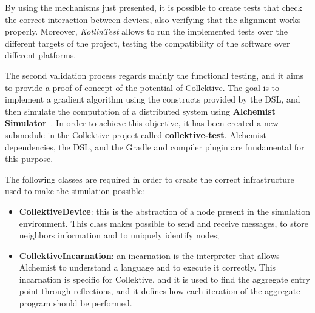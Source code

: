 By using the mechanisms just presented, it is possible to create tests that check the correct interaction between devices, also verifying that the alignment works properly. Moreover, \textit{KotlinTest} allows to run the implemented tests over the different targets of the project, testing the compatibility of the software over different platforms.

The second validation process regards mainly the functional testing, and it aims to provide a proof of concept of the potential of Collektive.\newline
The goal is to implement a gradient algorithm using the constructs provided by the DSL, and then simulate the computation of a distributed system using \textbf{Alchemist Simulator}~\cite{alchemist}.\newline
In order to achieve this objective, it has been created a new submodule in the Collektive project called \textbf{collektive-test}. Alchemist dependencies, the DSL, and the Gradle and compiler plugin are fundamental for this purpose. 

The following classes are required in order to create the correct infrastructure used to make the simulation possible:
\begin{itemize}
    \item \textbf{CollektiveDevice}: this is the abstraction of a node present in the simulation environment. This class makes possible to send and receive messages, to store neighbors information and to uniquely identify nodes;
    \item \textbf{CollektiveIncarnation}: an incarnation is the interpreter that allows Alchemist to understand a language and to execute it correctly. This incarnation is specific for Collektive, and it is used to find the aggregate entry point through reflections, and it defines how each iteration of the aggregate program should be performed.
\end{itemize}

